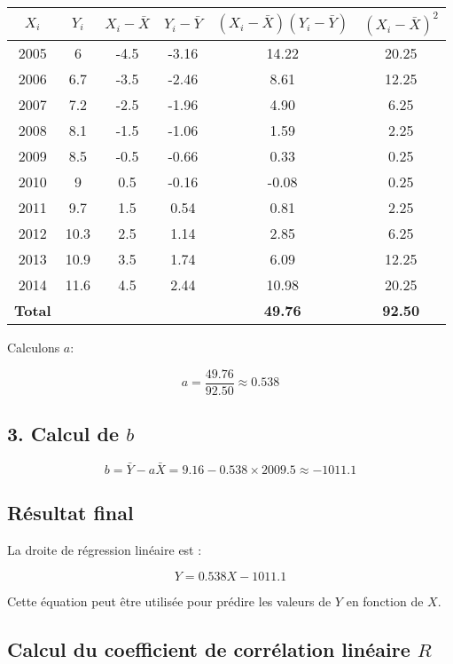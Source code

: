 \documentclass[12pt]{article}
\begin{document}
\begin{table}[h]
    \centering
    \begin{tabular}{|c|c|c|c|c|c|}
        \hline
        \(X_i\) & \(Y_i\) & \(X_i - \bar{X}\) & \(Y_i - \bar{Y}\) & \((X_i - \bar{X})(Y_i - \bar{Y})\) & \((X_i - \bar{X})^2\) \\
        \hline
        2005 & 6 & -4.5 & -3.16 & 14.22 & 20.25 \\
        2006 & 6.7 & -3.5 & -2.46 & 8.61 & 12.25 \\
        2007 & 7.2 & -2.5 & -1.96 & 4.90 & 6.25 \\
        2008 & 8.1 & -1.5 & -1.06 & 1.59 & 2.25 \\
        2009 & 8.5 & -0.5 & -0.66 & 0.33 & 0.25 \\
        2010 & 9 & 0.5 & -0.16 & -0.08 & 0.25 \\
        2011 & 9.7 & 1.5 & 0.54 & 0.81 & 2.25 \\
        2012 & 10.3 & 2.5 & 1.14 & 2.85 & 6.25 \\
        2013 & 10.9 & 3.5 & 1.74 & 6.09 & 12.25 \\
        2014 & 11.6 & 4.5 & 2.44 & 10.98 & 20.25 \\
        \hline
        \textbf{Total} & & & & \textbf{49.76} & \textbf{92.50} \\
        \hline
    \end{tabular}
\end{table}

Calculons \(a\):

\[
a = \frac{49.76}{92.50} \approx 0.538
\]

\subsection*{3. Calcul de \(b\)}

\[
b = \bar{Y} - a\bar{X} = 9.16 - 0.538 \times 2009.5 \approx -1011.1
\]

\subsection*{Résultat final}

La droite de régression linéaire est :

\[
Y = 0.538X - 1011.1
\]

Cette équation peut être utilisée pour prédire les valeurs de \(Y\) en fonction de \(X\).

\subsection*{Calcul du coefficient de corrélation linéaire \(R\)}
\end{document}
